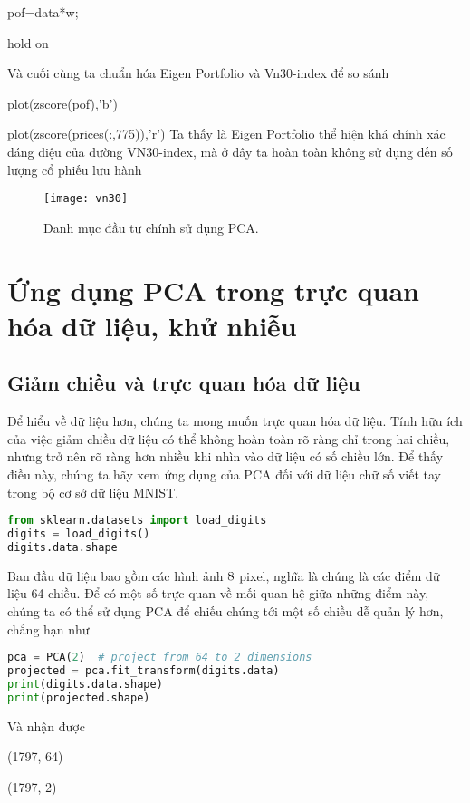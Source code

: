 pof=data*w;

hold on

Và cuối cùng ta chuẩn hóa Eigen Portfolio và Vn30-index để so sánh

plot(zscore(pof),’b’)

plot(zscore(prices(:,775)),’r’)
Ta thấy là Eigen Portfolio thể hiện khá chính xác dáng điệu của đường VN30-index, mà ở đây ta hoàn toàn không sử dụng đến số lượng cổ phiếu lưu hành
\begin{figure}
	\centering
	\texttt{[image: vn30]}
	\caption{Danh mục đầu tư chính sử dụng PCA.}
	\label{fig:vn30}
\end{figure}
\section{Ứng dụng PCA trong trực quan hóa dữ liệu, khử nhiễu}
\subsection{Giảm chiều và trực quan hóa dữ liệu}
Để hiểu về dữ liệu hơn, chúng ta mong muốn trực quan hóa dữ liệu. Tính hữu ích của việc giảm chiều dữ liệu có thể không hoàn toàn rõ ràng chỉ trong hai chiều, nhưng trở nên rõ ràng hơn nhiều khi nhìn vào dữ liệu có số chiều lớn. Để thấy điều này, chúng ta hãy xem ứng dụng của PCA đối với dữ liệu chữ số viết tay trong bộ cơ sở dữ liệu MNIST.
\begin{lstlisting}[language=Python]
from sklearn.datasets import load_digits
digits = load_digits()
digits.data.shape 
\end{lstlisting}
Ban đầu dữ liệu bao gồm các hình ảnh $8\time 8$ pixel, nghĩa là chúng là các điểm dữ liệu 64 chiều. Để có một số trực quan về mối quan hệ giữa những điểm này, chúng ta có thể sử dụng PCA để chiếu chúng tới một số chiều dễ quản lý hơn, chẳng hạn như
\begin{lstlisting}[language=Python]
pca = PCA(2)  # project from 64 to 2 dimensions
projected = pca.fit_transform(digits.data)
print(digits.data.shape)
print(projected.shape)
\end{lstlisting}
Và nhận được 

(1797, 64)

(1797, 2)

